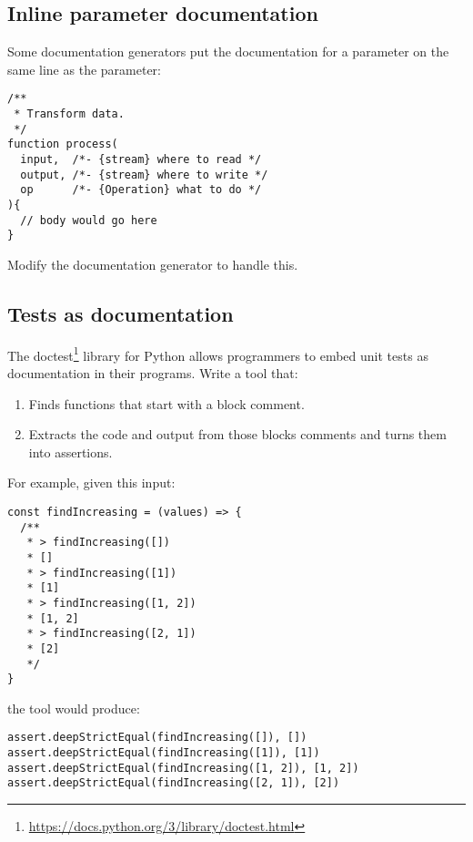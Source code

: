 \documentclass[krantzl]{krantz}
\newcommand{\hreffoot}[2]{{#1}\footnote{\href{#2}{#2}}}
\begin{document}
\subsection*{Inline parameter documentation}


Some documentation generators put the documentation for a parameter
on the same line as the parameter:

\begin{lstlisting}[frame=single,frameround=tttt]
/**
 * Transform data.
 */
function process(
  input,  /*- {stream} where to read */
  output, /*- {stream} where to write */
  op      /*- {Operation} what to do */
){
  // body would go here
}
\end{lstlisting}


\noindent Modify the documentation generator to handle this.

\subsection*{Tests as documentation}


The \hreffoot{doctest}{https://docs.python.org/3/library/doctest.html} library for Python
allows programmers to embed unit tests as documentation in their programs.
Write a tool that:

\begin{enumerate}

\item 

Finds functions that start with a block comment.



\item 

Extracts the code and output from those blocks comments
    and turns them into assertions.



\end{enumerate}


\noindent For example, given this input:

\begin{lstlisting}[frame=single,frameround=tttt]
const findIncreasing = (values) => {
  /**
   * > findIncreasing([])
   * []
   * > findIncreasing([1])
   * [1]
   * > findIncreasing([1, 2])
   * [1, 2]
   * > findIncreasing([2, 1])
   * [2]
   */
}
\end{lstlisting}


\noindent the tool would produce:

\begin{lstlisting}[frame=single,frameround=tttt]
assert.deepStrictEqual(findIncreasing([]), [])
assert.deepStrictEqual(findIncreasing([1]), [1])
assert.deepStrictEqual(findIncreasing([1, 2]), [1, 2])
assert.deepStrictEqual(findIncreasing([2, 1]), [2])
\end{lstlisting}
\end{document}
